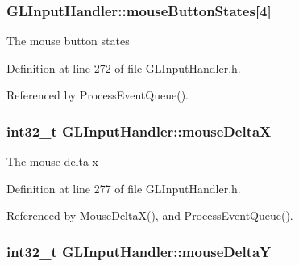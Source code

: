 \subsubsection[{\texorpdfstring{mouse\+Button\+States}{mouseButtonStates}}]{ G\+L\+Input\+Handler\+::mouse\+Button\+States\mbox{[}4\mbox{]}\hspace{0.3cm}{\ttfamily [private]}}\hypertarget{class_g_l_input_handler_a55300deac5e92292e389fdffb8403c39}{}\label{class_g_l_input_handler_a55300deac5e92292e389fdffb8403c39}


The mouse button states 



Definition at line 272 of file G\+L\+Input\+Handler.\+h.



Referenced by Process\+Event\+Queue().

\subsubsection[{\texorpdfstring{mouse\+DeltaX}{mouseDeltaX}}]{\setlength{\rightskip}{0pt plus 5cm}int32\+\_\+t G\+L\+Input\+Handler\+::mouse\+DeltaX\hspace{0.3cm}{\ttfamily [private]}}\hypertarget{class_g_l_input_handler_a2e7df62a21583ccbfcbc9ad3073c2200}{}\label{class_g_l_input_handler_a2e7df62a21583ccbfcbc9ad3073c2200}


The mouse delta x 



Definition at line 277 of file G\+L\+Input\+Handler.\+h.



Referenced by Mouse\+Delta\+X(), and Process\+Event\+Queue().

\subsubsection[{\texorpdfstring{mouse\+DeltaY}{mouseDeltaY}}]{\setlength{\rightskip}{0pt plus 5cm}int32\+\_\+t G\+L\+Input\+Handler\+::mouse\+DeltaY\hspace{0.3cm}{\ttfamily [private]}}\hypertarget{class_g_l_input_handler_a9f02e037ae5162dbd73f14be2961b767}{}\label{class_g_l_input_handler_a9f02e037ae5162dbd73f14be2961b767}


